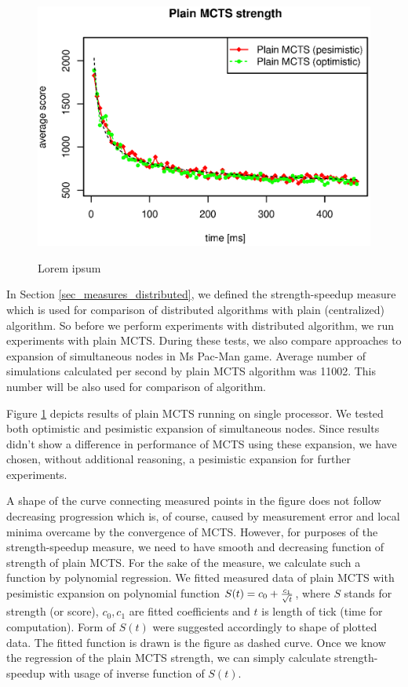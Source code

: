 \begin{figure}
\begin{center}
\includegraphics[width=12cm]{img/plain-mcts-strength.eps}
\end{center}
\caption{\footnotesize Lorem ipsum}{\footnotesize }
\label{fig_plain_mcts_strength}
\end{figure}


In Section \ref{sec_measures_distributed}, we defined the strength-speedup measure which
is used for comparison of distributed algorithms with plain (centralized) algorithm. So 
before we perform experiments with distributed algorithm, we run experiments with plain MCTS.
During these tests, we also compare approaches to expansion of simultaneous nodes in Ms Pac-Man
game. Average number of simulations calculated per second by plain MCTS algorithm was 11002.
This number will be also used for comparison of algorithm.

Figure \ref{fig_plain_mcts_strength} depicts results of plain MCTS running on single processor.
We tested both optimistic and pesimistic expansion of simultaneous nodes. Since results didn't 
show a difference in performance of MCTS using these expansion, we have chosen, without
additional reasoning, a pesimistic expansion for further experiments.

A shape of the curve connecting measured points in the figure does not follow decreasing
progression which is, of course, caused by measurement error and local minima overcame by the
convergence of MCTS. However, for purposes of the strength-speedup measure, we need to have
smooth and decreasing function of strength of plain MCTS. For the sake of the measure, we
calculate such a function by polynomial regression. We fitted measured data of plain MCTS with
pesimistic expansion on polynomial function $S(t) = c_0 + { c_1 \over \sqrt{t} }$, where $S$ stands
for strength (or score), $c_0,c_1$ are fitted
coefficients and $t$ is length of tick (time for computation). Form of $S(t)$ were suggested
accordingly to shape of plotted data. The fitted function is drawn is
the figure as dashed curve. Once we know the regression of the plain MCTS strength, we can
simply calculate strength-speedup with usage of inverse function of $S(t)$.

